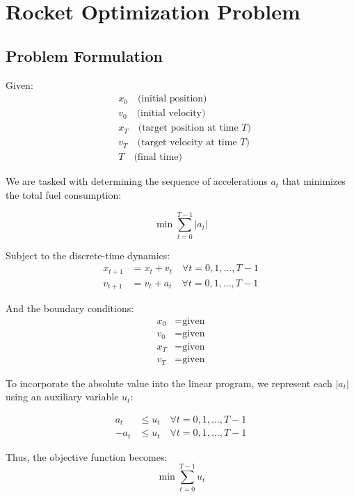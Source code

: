 \documentclass{article}
\begin{document}
\section*{Rocket Optimization Problem}

\subsection*{Problem Formulation}

Given:
\begin{align*}
    & x_0 \quad \text{(initial position)} \\
    & v_0 \quad \text{(initial velocity)} \\
    & x_T \quad \text{(target position at time } T\text{)} \\
    & v_T \quad \text{(target velocity at time } T\text{)} \\
    & T \quad \text{(final time)}
\end{align*}

We are tasked with determining the sequence of accelerations \( a_t \) that minimizes the total fuel consumption:

\[
\min \sum_{t=0}^{T-1} |a_t|
\]

Subject to the discrete-time dynamics:
\begin{align*}
    x_{t+1} &= x_t + v_t \quad \forall t = 0, 1, \ldots, T-1 \\
    v_{t+1} &= v_t + a_t \quad \forall t = 0, 1, \ldots, T-1
\end{align*}

And the boundary conditions:
\begin{align*}
    x_0 &= \text{given} \\
    v_0 &= \text{given} \\
    x_T &= \text{given} \\
    v_T &= \text{given}
\end{align*}

To incorporate the absolute value into the linear program, we represent each \( |a_t| \) using an auxiliary variable \( u_t \):

\begin{align*}
    a_t &\leq u_t \quad \forall t = 0, 1, \ldots, T-1 \\
    -a_t &\leq u_t \quad \forall t = 0, 1, \ldots, T-1
\end{align*}

Thus, the objective function becomes:
\[
\min \sum_{t=0}^{T-1} u_t
\]
\end{document}
